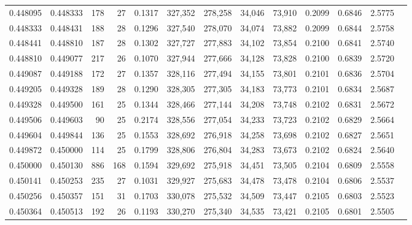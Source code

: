 \begin{tabular}{rrrrrrrrrrrrr}
0.448095 & 0.448333 &    178 &    27 &                                     0.1317 & 327,352 & 278,258 &  34,046 &  73,910 & 0.2099 & 0.6846 & 2.5775 \\
0.448333 & 0.448431 &    188 &    28 &                                     0.1296 & 327,540 & 278,070 &  34,074 &  73,882 & 0.2099 & 0.6844 & 2.5758 \\
0.448441 & 0.448810 &    187 &    28 &                                     0.1302 & 327,727 & 277,883 &  34,102 &  73,854 & 0.2100 & 0.6841 & 2.5740 \\
0.448810 & 0.449077 &    217 &    26 &                                     0.1070 & 327,944 & 277,666 &  34,128 &  73,828 & 0.2100 & 0.6839 & 2.5720 \\
0.449087 & 0.449188 &    172 &    27 &                                     0.1357 & 328,116 & 277,494 &  34,155 &  73,801 & 0.2101 & 0.6836 & 2.5704 \\
0.449205 & 0.449328 &    189 &    28 &                                     0.1290 & 328,305 & 277,305 &  34,183 &  73,773 & 0.2101 & 0.6834 & 2.5687 \\
0.449328 & 0.449500 &    161 &    25 &                                     0.1344 & 328,466 & 277,144 &  34,208 &  73,748 & 0.2102 & 0.6831 & 2.5672 \\
0.449506 & 0.449603 &     90 &    25 &                                     0.2174 & 328,556 & 277,054 &  34,233 &  73,723 & 0.2102 & 0.6829 & 2.5664 \\
0.449604 & 0.449844 &    136 &    25 &                                     0.1553 & 328,692 & 276,918 &  34,258 &  73,698 & 0.2102 & 0.6827 & 2.5651 \\
0.449872 & 0.450000 &    114 &    25 &                                     0.1799 & 328,806 & 276,804 &  34,283 &  73,673 & 0.2102 & 0.6824 & 2.5640 \\
0.450000 & 0.450130 &    886 &   168 &                                     0.1594 & 329,692 & 275,918 &  34,451 &  73,505 & 0.2104 & 0.6809 & 2.5558 \\
0.450141 & 0.450253 &    235 &    27 &                                     0.1031 & 329,927 & 275,683 &  34,478 &  73,478 & 0.2104 & 0.6806 & 2.5537 \\
0.450256 & 0.450357 &    151 &    31 &                                     0.1703 & 330,078 & 275,532 &  34,509 &  73,447 & 0.2105 & 0.6803 & 2.5523 \\
0.450364 & 0.450513 &    192 &    26 &                                     0.1193 & 330,270 & 275,340 &  34,535 &  73,421 & 0.2105 & 0.6801 & 2.5505 \\

\end{tabular}
